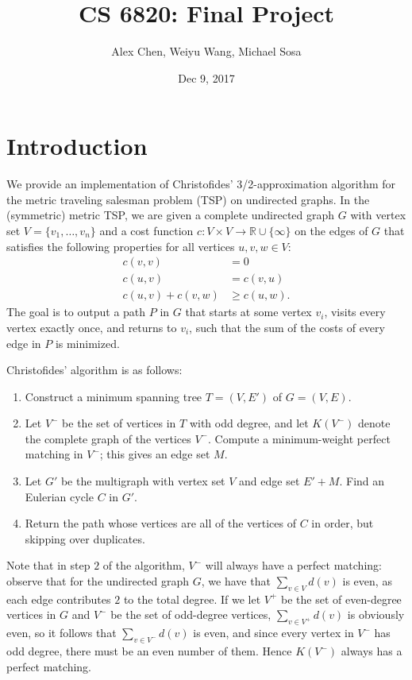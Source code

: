 \documentclass{article}
\title{CS 6820: Final Project}
\author{Alex Chen, Weiyu Wang, Michael Sosa}
\date{Dec 9, 2017}
\begin{document}
\maketitle

\section{Introduction}

We provide an implementation of Christofides' 3/2-approximation algorithm for the metric traveling salesman problem (TSP) on undirected graphs. In the (symmetric) metric TSP, we are given a complete undirected graph $G$ with vertex set $V = \{v_1, \ldots, v_n\}$ and a cost function $c \colon V \times V \to \mathbb{R} \cup \{\infty\}$ on the edges of $G$ that satisfies the following properties for all vertices $u, v, w \in V$:
\begin{align*}
	c(v, v) &= 0 \\
    c(u, v) &= c(v, u) \\
    c(u, v) + c(v, w) &\geq c(u, w).
\end{align*}
The goal is to output a path $P$ in $G$ that starts at some vertex $v_i$, visits every vertex exactly once, and returns to $v_i$, such that the sum of the costs of every edge in $P$ is minimized.

Christofides' algorithm is as follows:
\begin{enumerate}
	\item Construct a minimum spanning tree $T = (V, E')$ of $G = (V, E)$.
    \item Let $V^-$ be the set of vertices in $T$ with odd degree, and let $K(V^-)$ denote the complete graph of the vertices $V^-$. Compute a minimum-weight perfect matching in $V^-$; this gives an edge set $M$.
    \item Let $G'$ be the multigraph with vertex set $V$ and edge set $E' + M$. Find an Eulerian cycle $C$ in $G'$.
    \item Return the path whose vertices are all of the vertices of $C$ in order, but skipping over duplicates.
\end{enumerate}

Note that in step $2$ of the algorithm, $V^-$ will always have a perfect matching: observe that for the undirected graph $G$, we have that $\sum_{v \in V} d(v)$ is even, as each edge contributes $2$ to the total degree. If we let $V^+$ be the set of even-degree vertices in $G$ and $V^-$ be the set of odd-degree vertices, $\sum_{v \in V^+} d(v)$ is obviously even, so it follows that $\sum_{v \in V^-} d(v)$ is even, and since every vertex in $V^-$ has odd degree, there must be an even number of them. Hence $K(V^-)$ always has a perfect matching.
\end{document}
